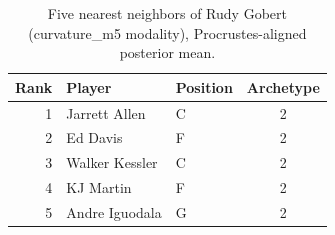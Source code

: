 \begin{table}[htbp]
  \centering\small
  \begin{tabular}{rllc}
    \toprule
    Rank & Player & Position & Archetype \\
    \midrule
    1 & Jarrett Allen & C & 2 \\
    2 & Ed Davis & F & 2 \\
    3 & Walker Kessler & C & 2 \\
    4 & KJ Martin & F & 2 \\
    5 & Andre Iguodala & G & 2 \\
    \bottomrule
  \end{tabular}
  \caption{Five nearest neighbors of Rudy Gobert (curvature_m5 modality), Procrustes-aligned posterior mean.}
  \label{tab:Rudy_Gobert_neighbors_curvature_m5}
\end{table}

